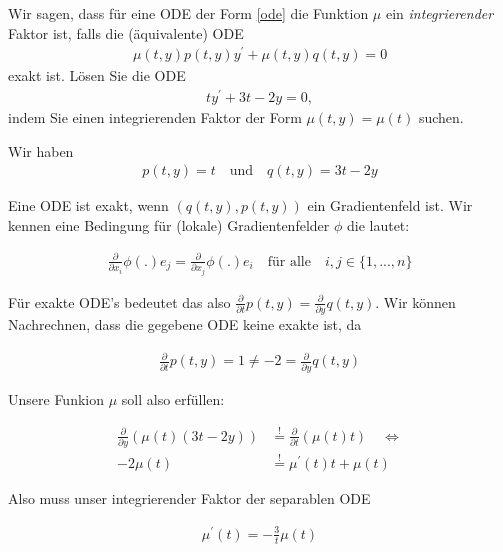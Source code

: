 \begin{exercise}
Wir sagen, dass für eine ODE der Form \eqref{ode} die Funktion $\mu$ ein
\textit{integrierender} Faktor ist, falls die (äquivalente) ODE
\begin{align*}
  \mu(t,y)p(t,y)y^{\prime} + \mu(t,y)q(t,y) = 0
\end{align*}
exakt ist. Lösen Sie die ODE
\begin{align*}
  ty^{\prime} + 3t - 2y = 0,
\end{align*}
indem Sie einen integrierenden Faktor der Form $\mu(t,y) = \mu(t)$ suchen. \\
\end{exercise}
\begin{solution}
  Wir haben
  \begin{align*}
    p(t, y) = t \quad \textrm{und} \quad q(t,y) = 3t - 2y
  \end{align*}

Eine ODE ist exakt, wenn $(q(t,y), p(t,y))$ ein Gradientenfeld ist. Wir kennen eine
Bedingung für (lokale) Gradientenfelder $\phi$ die lautet:

\begin{align*}
  \frac{\partial}{\partial x_i} \phi(.) e_j = \frac{\partial}{\partial x_j} \phi(.) e_i
  \quad \text{für alle} \quad i, j \in \{1,...,n\}
\end{align*}

Für exakte ODE's bedeutet  das also $\frac{\partial}{\partial t} p(t,y) =
\frac{\partial}{\partial y} q(t,y)$.
Wir können Nachrechnen, dass die gegebene ODE keine exakte ist, da

  \begin{align*}
    \frac{\partial}{\partial t} p(t,y) = 1 \neq -2 = \frac{\partial}{\partial y} q(t,y)
  \end{align*}

Unsere Funkion $\mu$ soll also erfüllen:

  \begin{align*}
    \frac{\partial}{\partial y} (\mu(t)(3t-2y)) &\stackrel{!}{=}
    \frac{\partial}{\partial t} (\mu(t) t)
    \quad \Leftrightarrow \\
    -2\mu(t) &\stackrel{!}{=} \mu^\prime (t)t+ \mu(t)
   \end{align*}

Also muss unser integrierender Faktor der separablen ODE

\begin{align*}
  \mu^\prime (t) = -\frac{3}{t} \mu(t)
\end{align*}


\end{solution}
